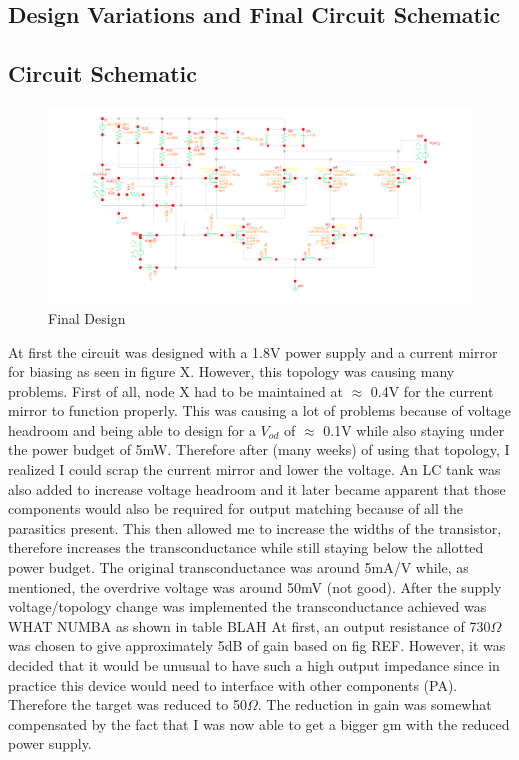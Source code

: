 \documentclass{article}                                                         %
\begin{document}
\newpage
\begin{landscape}

\section{Design Variations and Final Circuit Schematic}
\subsection{Circuit Schematic}

\begin{figure}[H]
  \centering
  \includegraphics[width=1.5\textwidth] {Figures/Circuit.png}
  \caption{Final Design}
    \label{fig:finalschem}
\end{figure}
\end{landscape}
\newpage
At first the circuit was designed with a 1.8V power supply and a current mirror for biasing
as seen in figure X. However, this topology was causing many problems. First of all, node X
had to be maintained at $\approx$ 0.4V for the current mirror to function properly. This was
causing a lot of problems because of voltage headroom and being able to design for a $V_{od}$
of $\approx$ 0.1V while also staying under the power budget of 5mW. Therefore after (many weeks)
of using that topology, I realized I could scrap the current mirror and lower the voltage. An LC
tank was also added to increase voltage headroom and it later became apparent that those components would
also be required for output matching because of all the parasitics present.
This then allowed me to increase the widths of the transistor, therefore increases the transconductance
while still staying below the allotted power budget. The original transconductance was around 5mA/V while,
as mentioned, the overdrive voltage was around 50mV (not good). After the supply voltage/topology change
was implemented the transconductance achieved was WHAT NUMBA as shown in table BLAH
At first, an output resistance of 730$\Omega$
was chosen to give approximately 5dB of gain based on fig REF. However, it was decided that it would
be unusual to have such a high output impedance since in practice this device would need to interface
with other components (PA). Therefore the target was reduced to 50$\Omega$. The reduction in gain was
somewhat compensated by the fact that I was now able to get a bigger gm with the reduced power supply.
\end{document}
